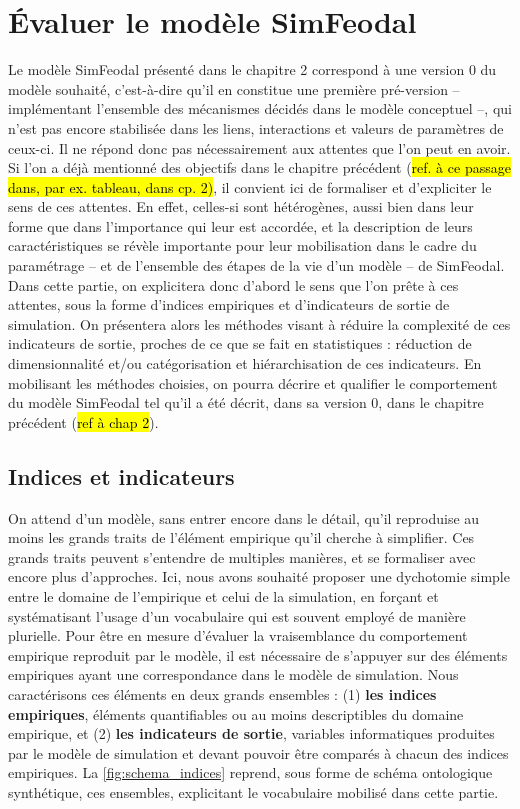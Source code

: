 \clearpage
\section[Évaluer SimFeodal]{Évaluer le modèle SimFeodal}

Le modèle SimFeodal présenté dans le chapitre 2 correspond à une \og version 0\fg{} du modèle souhaité, c'est-à-dire qu'il en constitue une première pré-version -- implémentant l'ensemble des mécanismes décidés dans le modèle conceptuel --, qui n'est pas encore stabilisée dans les liens, interactions et valeurs de paramètres de ceux-ci.
Il ne répond donc pas nécessairement aux attentes que l'on peut en avoir.
Si l'on a déjà mentionné des objectifs dans le chapitre précédent (\hl{ref. à ce passage dans, par ex. tableau, dans cp. 2)}, il convient ici de formaliser et d'expliciter le sens de ces attentes.
En effet, celles-si sont hétérogènes, aussi bien dans leur forme que dans l'importance qui leur est accordée, et la description de leurs caractéristiques se révèle importante pour leur mobilisation dans le cadre du paramétrage -- et de l'ensemble des étapes de la vie d'un modèle -- de SimFeodal.
Dans cette partie, on explicitera donc d'abord le sens que l'on prête à ces attentes, sous la forme d'indices empiriques et d'indicateurs de sortie de simulation. On présentera alors les méthodes visant à réduire la complexité de ces indicateurs de sortie, proches de ce que se fait en statistiques : réduction de dimensionnalité et/ou catégorisation et hiérarchisation de ces indicateurs. En mobilisant les méthodes choisies, on pourra décrire et qualifier le comportement du modèle SimFeodal tel qu'il a été décrit, dans sa version 0, dans le chapitre précédent (\hl{ref à chap 2}).

\subsection{Indices et indicateurs}

On attend d'un modèle, sans entrer encore dans le détail, qu'il reproduise au moins les grands traits de l'élément empirique qu'il cherche à simplifier.
Ces grands traits peuvent s'entendre de multiples manières, et se formaliser avec encore plus d'approches. Ici, nous avons souhaité proposer une dychotomie simple entre le domaine de l'empirique et celui de la simulation, en forçant et systématisant l'usage d'un vocabulaire qui est souvent employé de manière plurielle. Pour être en mesure d'évaluer la vraisemblance du comportement empirique reproduit par le modèle, il est nécessaire de s'appuyer sur des éléments empiriques ayant une correspondance dans le modèle de simulation. Nous caractérisons ces éléments en deux grands ensembles : (1) \textbf{les indices empiriques}, éléments quantifiables ou au moins descriptibles du domaine empirique, et  (2) \textbf{les indicateurs de sortie}, variables informatiques produites par le modèle de simulation et devant pouvoir être comparés à chacun des indices empiriques.
La \cref{fig:schema_indices} reprend, sous forme de schéma ontologique synthétique, ces ensembles, explicitant le vocabulaire mobilisé dans cette partie.

